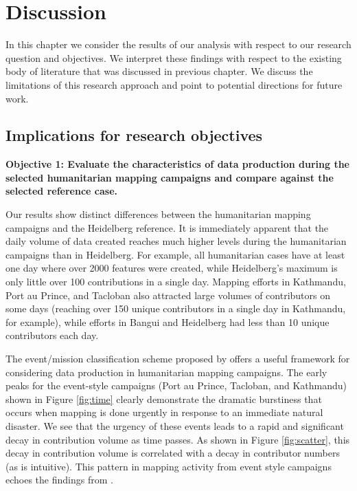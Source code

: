 \chapter{Discussion}
\label{chapterlabel6}

In this chapter we consider the results of our analysis with respect to our research question and objectives. We interpret these findings with respect to the existing body of literature that was discussed in previous chapter. We discuss the limitations of this research approach and point to potential directions for future work. 

\section{Implications for research objectives}

\noindent\textbf{Objective 1: Evaluate the characteristics of data production during the selected humanitarian mapping campaigns and compare against the selected reference case.} 

Our results show distinct differences between the humanitarian mapping campaigns and the Heidelberg reference. It is immediately apparent that the daily volume of data created reaches much higher levels during the humanitarian campaigns than in Heidelberg. For example, all humanitarian cases have at least one day where over 2000 features were created, while Heidelberg's maximum is only little over 100 contributions in a single day. Mapping efforts in Kathmandu, Port au Prince, and Tacloban also attracted large volumes of contributors on some days (reaching over 150 unique contributors in a single day in Kathmandu, for example), while efforts in Bangui and Heidelberg had less than 10 unique contributors each day. 

The event/mission classification scheme proposed by \textcite{dittus_mass_2017} offers a useful framework for considering data production in humanitarian mapping campaigns. The early peaks for the event-style campaigns (Port au Prince, Tacloban, and Kathmandu) shown in Figure \ref{fig:time} clearly demonstrate the dramatic burstiness that occurs when mapping is done urgently in response to an immediate natural disaster. We see that the urgency of these events leads to a rapid and significant decay in contribution volume as time passes. As shown in Figure \ref{fig:scatter}, this decay in contribution volume is correlated with a decay in contributor numbers (as is intuitive). This pattern in mapping activity from event style campaigns echoes the findings from \textcite[p. 1294]{dittus_mass_2017}.


